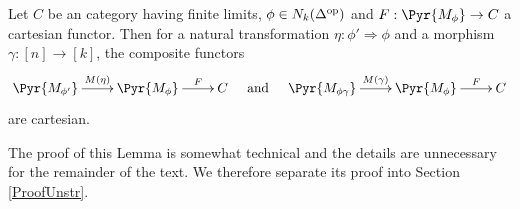 \documentclass[a4paper]{article}
\numberwithin{equation}{section}
\begin{document}
\begin{lem}
\label{UnstrLem}
 Let $C$ be an category having finite limits, $\phi \in N_k(\Delta^{\rm op})$ and $F:\Pyr{M_\phi} \to C$ a cartesian functor. Then for a natural transformation $\eta: \phi' \Rightarrow \phi$ and a morphism $\gamma:[n] \to [k]$, the composite functors
 \begin{equation*}
  \xymatrixcolsep{.7pc} \xymatrix{ \Pyr{M_{\phi'}} \ar[rr]^-{M(\eta)} & & \Pyr{M_\phi} \ar[rr]^-F & & C & {\rm and} & \Pyr{M_{ \phi\gamma }} \ar[rr]^-{M(\gamma)} & & \Pyr{M_\phi} \ar[rr]^-F & & C}
 \end{equation*}
are cartesian. 
\end{lem}
 The proof of this Lemma is somewhat technical and the details are unnecessary for the remainder of the text. We therefore separate its proof into Section \ref{ProofUnstr}.
\end{document}
